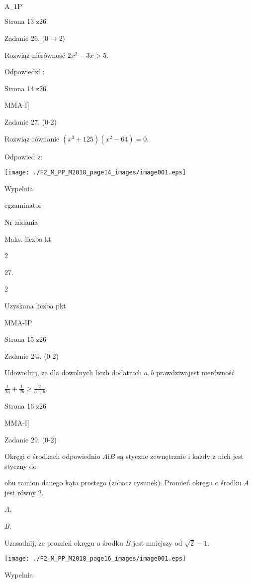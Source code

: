 \documentclass[a4paper,12pt]{article}
\begin{document}
$\mathrm{A}_{-}1\mathrm{P}$

Strona 13 z26





Zadanie 26. $(0\rightarrow 2\rangle$

Rozwiąz nierówność $2x^{2}-3x>5.$

Odpowiedzí :

Strona 14 z26

MMA-I]





Zadanie 27. (0-2)

Rozwiąz równanie $(x^{3}+125)(x^{2}-64)=0.$

Odpowied $\acute{\mathrm{z}}$:
\begin{center}
\texttt{[image: ./F2\_M\_PP\_M2018\_page14\_images/image001.eps]}
\end{center}
Wypelnia

egzaminator

Nr zadania

Maks. liczba kt

2

27.

2

Uzyskana liczba pkt

MMA-IP

Strona 15 z26





Zadanie 2@. (0-2)

Udowodnij, $\dot{\mathrm{z}}\mathrm{e}$ dla dowolnych liczb dodatnich $a, b$ prawdziwajest nierówność

$\displaystyle \frac{1}{2a}+\frac{1}{2b}\geq\frac{2}{a+b}.$

Strona 16 z26

MMA-I]





Zadanie 29. (0-2)

Okręgi o środkach odpowiednio $A\mathrm{i}B$ są styczne zewnętrznie i $\mathrm{k}\mathrm{a}\dot{\mathrm{z}}\mathrm{d}\mathrm{y}$ z nich jest styczny do

obu ramion danego kąta prostego (zobacz rysunek). Promień okręgu o środku $A$ jest równy 2.

{\it A}.

{\it B}.

Uzasadnij, $\dot{\mathrm{z}}\mathrm{e}$ promień okręgu o środku $B$ jest mniejszy od $\sqrt{2}-1.$
\begin{center}
\texttt{[image: ./F2\_M\_PP\_M2018\_page16\_images/image001.eps]}
\end{center}
Wypelnia
\end{document}

